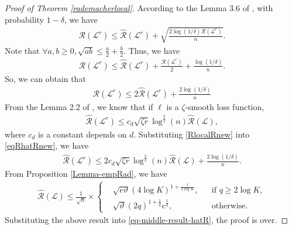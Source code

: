 \documentclass{article}
\begin{document}
\begin{proof}[Proof of Theorem \ref{rademacherlocal}]
  According to the Lemma 3.6 of \cite{oneto2013improved},
  with probability $1-\delta$, we have
  \begin{align*}
    \mathcal{R}(\mathcal{L}^r)\leq \hat{\mathcal{R}}(\mathcal{L}^r)+\sqrt{\frac{2\log(1/\delta)\mathcal{R}(\mathcal{L}^r)}{n}}.
  \end{align*}
  Note that $\forall a,b\geq 0, \sqrt{ab}\leq \frac{a}{2}+\frac{b}{2}$.
  Thus, we have
  \begin{align*}
    \mathcal{R}(\mathcal{L}^r)\leq \hat{\mathcal{R}}(\mathcal{L}^r)+\frac{\mathcal{R}(\mathcal{L}^r)}{2}+\frac{\log(1/\delta)}{n}.
  \end{align*}
  So, we can obtain that
  \begin{align}
  \label{eqRhatRnew}
    \mathcal{R}(\mathcal{L}^r)\leq 2\hat{\mathcal{R}}(\mathcal{L}^r)+\frac{2\log(1/\delta)}{n}
  \end{align}
  From the Lemma 2.2 of \cite{Srebro2010lrc},
  we know that if $\ell$ is a $\zeta$-smooth loss function,
  \begin{align}
   \label{RlocalRnew}
    \hat{\mathcal{R}}(\mathcal{L}^r)\leq c_d\sqrt{\zeta r}\log^{\frac{3}{2}}(n)\hat{\mathcal{R}}(\mathcal{L}),
  \end{align}
  where $c_d$ is a constant depends on $d$.
  Substituting  \eqref{RlocalRnew} into \eqref{eqRhatRnew},
  we have
  \begin{align}
  \label{eq-middle-result-hatR}
    \hat{\mathcal{R}}(\mathcal{L}^r)\leq 2c_d\sqrt{\zeta r}\log^{\frac{3}{2}}(n)\hat{\mathcal{R}}(\mathcal{L})
    +\frac{2\log(1/\delta)}{n}.
  \end{align}
  From Proposition  \ref{Lemma-empRad},
  we have
  \begin{align*}
    \hat{\mathcal{R}}(\mathcal{L})\leq \frac{1}{\sqrt{n}}\times
      \left\{
      \begin{aligned}
      &\sqrt{e\vartheta}(4\log K)^{1+\frac{1}{2\log K}}, &&\text{if } q\geq 2\log K,\\
      &\sqrt{\vartheta}(2q)^{1+\frac{1}{q}}c^{\frac{1}{q}}, &&\text{otherwise.}
      \end{aligned}
      \right.
  \end{align*}
  Substituting the above result into \eqref{eq-middle-result-hatR},
  the proof is over.
\end{proof}
\end{document}
